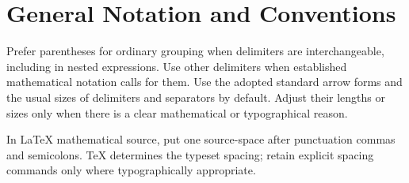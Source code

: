 \section{General Notation and Conventions}

Prefer parentheses for ordinary grouping when delimiters are interchangeable, including in nested expressions. Use other delimiters when established mathematical notation calls for them. Use the adopted standard arrow forms and the usual sizes of delimiters and separators by default. Adjust their lengths or sizes only when there is a clear mathematical or typographical reason.

In LaTeX mathematical source, put one source-space after punctuation commas and semicolons. TeX determines the typeset spacing; retain explicit spacing commands only where typographically appropriate.

